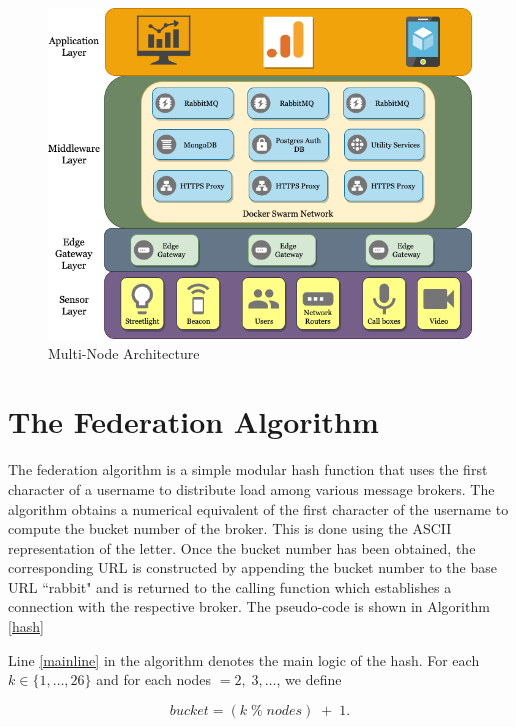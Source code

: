 \documentclass[conference, 10pt]{IEEEtran}
\begin{document}
\begin{figure}
\includegraphics[width=\linewidth, height=\linewidth, keepaspectratio]{MultiNode.png}
\caption{Multi-Node Architecture}
\label{multinode}
\end{figure}

\section{The Federation Algorithm} \label{hashalgo}
The federation algorithm is a simple modular hash function that uses the first character of a username to distribute load among various message brokers. The algorithm obtains a numerical equivalent of the first character of the username to compute the bucket number of the broker. This is done using the ASCII \cite{ascii} representation of the letter. Once the bucket number has been obtained, the corresponding URL is constructed by appending the bucket number to the base URL ``rabbit" and is returned to the calling function which establishes a connection with the respective broker. The pseudo-code is shown in Algorithm \ref{hash} 

Line \ref{mainline} in the algorithm denotes the main logic of the hash. For each $k\in\{1,\ldots,26\}$ and for each nodes $=2,\;3,\ldots$, we define  

\begin{equation}
bucket = (k \; \% \; nodes) \; + \; 1.
\end{equation} 
\end{document}
